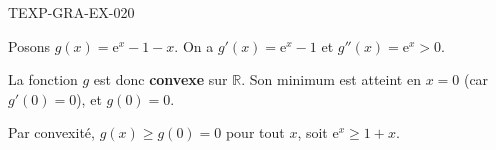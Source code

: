 \begin{corrige}{TEXP-GRA-EX-020}


Posons $g(x) = \mathrm{e}^x - 1 - x$. On a $g'(x) = \mathrm{e}^x - 1$ et $g''(x) = \mathrm{e}^x > 0$.

La fonction $g$ est donc \textbf{convexe} sur $\mathbb{R}$. Son minimum est atteint en $x=0$ (car $g'(0)=0$), et $g(0) = 0$.

Par convexité, $g(x) \geq g(0) = 0$ pour tout $x$, soit $\mathrm{e}^x \geq 1 + x$.

\end{corrige}
